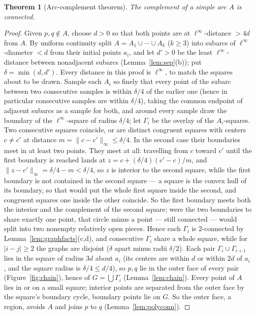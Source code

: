 \documentclass[11pt,a4paper]{article}
\theoremstyle{jsplain}
\newtheorem{theorem}{Theorem}[section]
\theoremstyle{jsdefn}
\begin{document}
\begin{theorem}[Arc-complement theorem]\label{thm:arc}
The complement of a simple arc $A$ is connected.
\end{theorem}
\begin{proof}
Given $p,q\notin A$, choose $d>0$ so that both points are at
$\ell^\infty$-distance $>4d$ from $A$. By uniform continuity split $A=A_1\cup\cdots\cup A_k$ ($k\ge3$) into
subarcs of $\ell^\infty$-diameter $<d$ from their initial points
$a_i$, and let $d'>0$ be the least $\ell^\infty$-distance between
nonadjacent subarcs (Lemma~\ref{lem:sep}(b)); put
$\delta=\min(d,d')$. Every distance in this proof is $\ell^\infty$, to
match the squares about to be drawn. Sample each
$A_i$ so finely that every point of the subarc between two consecutive
samples is within $\delta/4$ of the earlier one (hence in particular
consecutive samples are within $\delta/4$), taking the common endpoint
of adjacent subarcs as a sample for both, and
around every sample draw the boundary of the $\ell^\infty$-square of
radius $\delta/4$; let $\Gamma_i$ be the overlay of the $A_i$-squares.
Two consecutive squares coincide, or are distinct congruent squares
with centers $c\ne c'$ at distance $m=\|c-c'\|_\infty\le\delta/4$. In
the second case their boundaries meet in at least two points. They meet
at all: travelling from $c$ toward $c'$ until the first boundary is
reached lands at $z=c+(\delta/4)(c'-c)/m$, and
$\|z-c'\|_\infty=\delta/4-m<\delta/4$, so $z$ is interior to the second
square, while the first boundary is not contained in the second square
--- a square is the convex hull of its boundary, so that would put the
whole first square inside the second, and congruent squares one inside
the other coincide. So the first boundary meets both the interior and
the complement of the second square; were the two boundaries to share
exactly one point, that circle minus a point --- still connected ---
would split into two nonempty relatively open pieces. Hence each
$\Gamma_i$ is 2-connected by Lemma~\ref{lem:graphfacts}(c,d), and
consecutive $\Gamma_i$ share a whole square, while for $|i-j|\ge2$ the
graphs are disjoint ($\delta$ apart minus radii $\delta/2$). Each pair
$\Gamma_i\cup\Gamma_{i+1}$ lies in the square of radius $3d$ about
$a_i$ (its centers are within $d$ or within $2d$ of $a_i$, and the
square radius is $\delta/4\le d/4$), so $p,q$ lie in the outer
face of every pair (Figure~\ref{fig:chain}), hence of $G=\bigcup\Gamma_i$
(Lemma~\ref{lem:chain}). Every point of $A$ lies in or on a small
square; interior points are separated from the outer face by the
square's boundary cycle, boundary points lie on $G$. So the outer
face, a region, avoids $A$ and joins $p$ to $q$
(Lemma~\ref{lem:polyconn}).
\end{proof}
\end{document}
